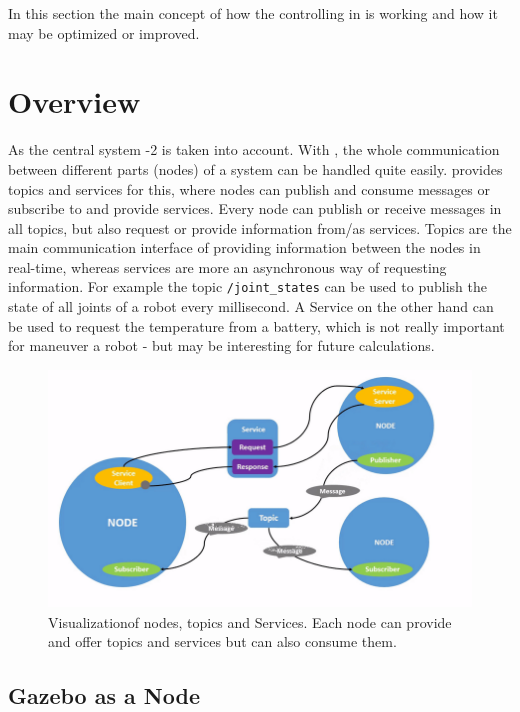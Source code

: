 
In this section the main concept of how the controlling in  is working and how it may be optimized or improved.

\section[Overview]{Overview} \label{sec:concept-overview}

As the central system -2 is taken into account.
With , the whole communication between different parts (nodes) of a system can be handled quite easily.
 provides topics and services for this, where nodes can publish and consume messages or subscribe to and provide services.
Every node can publish or receive messages in all topics, but also request or provide information from/as services.
Topics are the main communication interface of providing information between the nodes in real-time, whereas services are more an asynchronous way of requesting information.
For example the topic \texttt{/joint\_states} can be used to publish the state of all joints of a robot every millisecond.
A Service on the other hand can be used to request the temperature from a battery, which is not really important for maneuver a robot - but may be interesting for future calculations.

\begin{figure}[H]
    \centering
    \includegraphics[width=0.6\linewidth]{images/NodesTopicandService}
    \caption[ Nodes, Topics and Services]{Visualization\protect\footnotemark of  \Glspl{node}, \Glspl{topic} and Services. Each node can provide and offer topics and services but can also consume them.}
    \label{fig:ros-nodes-topics-services}
\end{figure}



\subsection[Gazebo]{Gazebo as a Node} \label{sec:gazebo-node}

